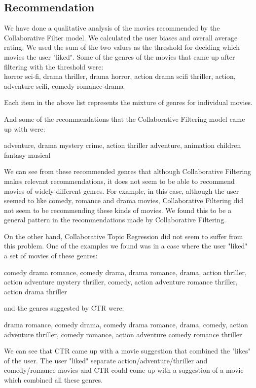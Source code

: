 \documentclass{article} %
\begin{document}
\subsection{Recommendation}

We have done a qualitative analysis of the movies recommended by the 
Collaborative Filter model. We calculated the user biases and overall average 
rating. We used the sum of the two values as the threshold 
for deciding which movies the user "liked". Some of the genres of the movies that came up after filtering with the threshold were: \\
horror sci-fi, drama thriller, drama horror, action drama scifi thriller, action, adventure scifi, comedy romance drama

Each item in the above list represents the mixture of genres for individual movies. 

And some of the recommendations that the Collaborative Filtering model came up with were:

adventure, drama mystery crime, action thriller adventure, animation children fantasy musical

We can see from these recommended genres that although Collaborative Filtering makes relevant recommendations, 
it does not seem to be able to recommend movies of widely different genres. For example, in this case, although the user 
seemed to like comedy, romance and drama movies, Collaborative Filtering did not seem to be recommending these kinds of movies.
We found this to be a general pattern in the recommendations made by Collaborative Filtering.

On the other hand, Collaborative Topic Regression did not seem to suffer from this problem. One of the examples we found was in 
a case where the user "liked" a set of movies of these genres:

comedy drama romance, comedy drama, drama romance, drama, action thriller, action adventure mystery thriller, comedy, action adventure romance thriller, action drama thriller

and the genres suggested by CTR were:

drama romance, comedy drama, comedy drama romance, drama, comedy, action adventure thriller, comedy romance, action adventure comedy romance thriller

We can see that CTR came up with a movie suggestion that combined the "likes" of the user.
The user "liked" separate action/adventure/thriller and comedy/romance movies and CTR could come up with a suggestion of a movie which combined all these genres.
\end{document}
